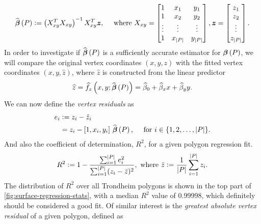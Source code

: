 \begin{align*}
  \widehat{\boldsymbol{\beta}}\left(P\right)
  \vcentcolon=
  \left( X_{xy}^T X_{xy} \right)^{-1} X_{xy}^T \boldsymbol{z},
  \hspace{1em}
  \text{ where }
  X_{xy}
  =
  \begin{bmatrix}
    1 & x_{1} & y_{1} \\
    1 & x_{2} & y_{2} \\
    \vdots & \vdots & \vdots \\
    1 & x_{|P|} & y_{|P|} \\
  \end{bmatrix},
  \boldsymbol{z}
  =
  \begin{bmatrix}
     z_{1} \\
     z_{2} \\
     \vdots \\
     z_{|P|} \\
  \end{bmatrix}.
\end{align*}
%
In order to investigate if $\widehat{\boldsymbol{\beta}}\left(P\right)$ is a sufficiently accurate estimator for $\boldsymbol{\beta}\left(P\right)$, we will compare the original vertex coordinates $(x, y, z)$ with the fitted vertex coordinates $(x, y, \hat{z})$, where $\hat{z}$ is constructed from the linear predictor
\begin{equation*}
  \widehat{z}
  =
  \widehat{f}_z\left(x, y; \widehat{\boldsymbol{\beta}}\left(P\right)\right)
  =
  \widehat{\beta}_{0}
  + \widehat{\beta}_{x} x
  + \widehat{\beta}_{y} y.
\end{equation*}
%
We can now define the \textit{vertex residuals} as
%
\begin{align*}
  e_i
  &\vcentcolon=
  z_i - \hat{z}_i
  \\
  &=
  z_i - [1, x_i, y_i]~\widehat{\boldsymbol{\beta}}\left(P\right),
  \quad \text{ for } i \in \{1, 2, \ldots, |P|\}.
\end{align*}
%
And also the coefficient of determination, $R^2$, for a given polygon regression fit.
%
\begin{equation*}
  R^2
  \defeq
    1
    -
    \frac{
      \sum_{i = 1}^{|P|} e_i^2
    }{%
    \sum_{i = 1}^{|P|} (z_i - \bar{z})^2
    },
  \text{ where }
  \bar{z} \defeq \frac{1}{|P|} \sum_{i=1}^{|P|} z_i.
\end{equation*}
%
The distribution of $R^2$ over all Trondheim polygons is shown in the top part of \cref{fig:surface-regression-stats}, with a median $R^2$ value of 0.99998, which definitely should be considered a good fit.
Of similar interest is the \textit{greatest absolute vertex residual} of a given polygon, defined as 
